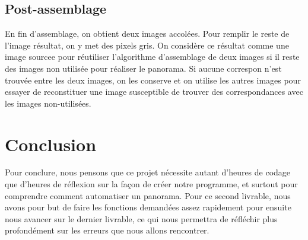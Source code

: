\documentclass[a4paper,french,12pt]{report}
\begin{document}
		\section{Post-assemblage}
		    En fin d'assemblage, on obtient deux images accolées. Pour remplir le reste de l'image résultat, on y met des pixels gris. On considère ce résultat comme une image sourcee pour réutiliser l'algorithme d'assemblage de deux images si il reste des images non utilisée pour réaliser le panorama. Si aucune correspon n'est trouvée entre les deux images, on les conserve et on utilise les autres images pour essayer de reconstituer une image susceptible de trouver des correspondances avec les images non-utilisées.
	\chapter*{Conclusion}
	    Pour conclure, nous pensons que ce projet nécessite autant d'heures de codage que d'heures de réflexion sur la façon de créer notre programme, et surtout pour comprendre comment automatiser un panorama. Pour ce second livrable, nous avons pour but de faire les fonctions demandées assez rapidement pour ensuite nous avancer sur le dernier livrable, ce qui nous permettra de réfléchir plus profondément sur les erreurs que nous allons rencontrer.
	    \cite{operationpixel}
	    \newpage
	    
\printbibliography
\end{document}
